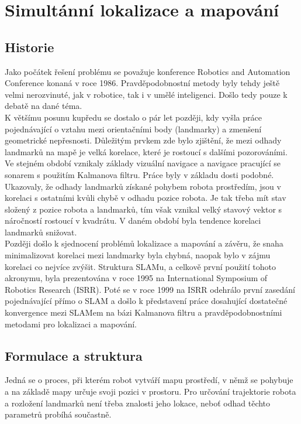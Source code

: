 \documentclass[12pt]{article}
\begin{document}
\newpage

\section{Simultánní lokalizace a mapování}

\subsection{Historie}
Jako počátek řešení problému se považuje konference Robotics and Automation Conference konaná v roce 1986. Pravděpodobnostní metody byly tehdy ještě velmi nerozvinuté, jak v robotice, tak i v umělé inteligenci. Došlo tedy pouze k debatě na dané téma.\\
\indent K většímu posunu kupředu se dostalo o pár let později, kdy vyšla práce pojednávající o vztahu mezi orientačními body (landmarky) a zmenšení geometrické nepřesnosti. Důležitým prvkem zde bylo zjištění, že mezi odhady landmarků na mapě je velká korelace, které je rostoucí s dalšími pozorováními.\\
\indent Ve stejném období vznikaly základy vizuální navigace a navigace pracující se sonarem s použitím Kalmanova filtru. Práce byly v základu dosti podobné. Ukazovaly, že odhady landmarků získané pohybem robota prostředím, jsou v korelaci s ostatními kvůli chybě v odhadu pozice robota. Je tak třeba mít stav složený z pozice robota a landmarků, tím však vznikal velký stavový vektor s náročností rostoucí v kvadrátu. V daném období byla tendence korelaci landmarků snižovat.\\
\indent Později došlo k sjednocení problémů lokalizace a mapování a závěru, že snaha minimalizovat korelaci mezi landmarky byla chybná, naopak bylo v zájmu korelaci co nejvíce zvýšit. Struktura SLAMu, a celkově první použití tohoto akronymu, byla prezentována v roce 1995 na International Symposium of Robotics Research (ISRR). Poté se v roce 1999 na ISRR odehrálo první zasedání pojednávající přímo o SLAM a došlo k představení práce dosahující dostatečné konvergence mezi SLAMem na bázi Kalmanova filtru a pravděpodobnostními metodami pro lokalizaci a mapování.


\subsection{Formulace a struktura} 
Jedná se o proces, při kterém robot vytváří mapu prostředí, v němž se pohybuje a na základě mapy určuje svoji pozici v prostoru. Pro určování trajektorie robota a rozložení landmarků není třeba znalosti jeho lokace, neboť odhad těchto parametrů probíhá součastně. 
\end{document}
